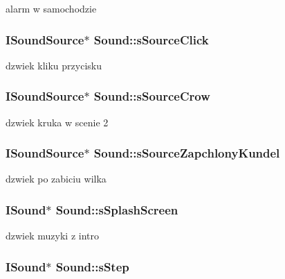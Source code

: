 \label{class_sound_a0c689fbdc20fbe58c0b5f2669a818838}
alarm w samochodzie \hypertarget{class_sound_ac300cf460eef51ef16f5d634193fd96e}{
\subsubsection[{sSourceClick}]{\setlength{\rightskip}{0pt plus 5cm}ISoundSource$\ast$ {\bf Sound::sSourceClick}}}
\label{class_sound_ac300cf460eef51ef16f5d634193fd96e}
dzwiek kliku przycisku \hypertarget{class_sound_ac08242c25a195befdc4a349d1fc25746}{
\subsubsection[{sSourceCrow}]{\setlength{\rightskip}{0pt plus 5cm}ISoundSource$\ast$ {\bf Sound::sSourceCrow}}}
\label{class_sound_ac08242c25a195befdc4a349d1fc25746}
dzwiek kruka w scenie 2 \hypertarget{class_sound_ae251d500da7c338e7f95057b178857a4}{
\subsubsection[{sSourceZapchlonyKundel}]{\setlength{\rightskip}{0pt plus 5cm}ISoundSource$\ast$ {\bf Sound::sSourceZapchlonyKundel}}}
\label{class_sound_ae251d500da7c338e7f95057b178857a4}
dzwiek po zabiciu wilka \hypertarget{class_sound_abb073c6731d173ea6d885a86d1ee508c}{
\subsubsection[{sSplashScreen}]{\setlength{\rightskip}{0pt plus 5cm}ISound$\ast$ {\bf Sound::sSplashScreen}}}
\label{class_sound_abb073c6731d173ea6d885a86d1ee508c}
dzwiek muzyki z intro \hypertarget{class_sound_ae8746893263e4c23113008db6d87327f}{
\subsubsection[{sStep}]{\setlength{\rightskip}{0pt plus 5cm}ISound$\ast$ {\bf Sound::sStep}}}
\label{class_sound_ae8746893263e4c23113008db6d87327f}
